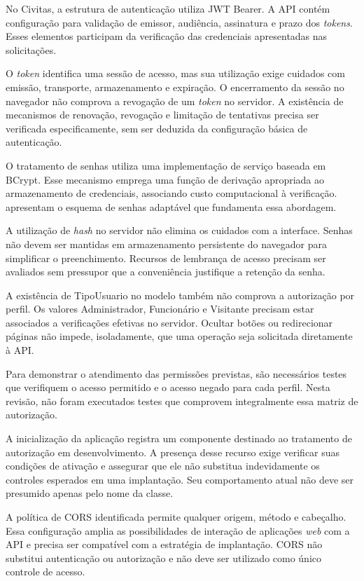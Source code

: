 No Civitas, a estrutura de autenticação utiliza JWT Bearer. A API contém configuração para validação de emissor, audiência, assinatura e prazo dos \textit{tokens}. Esses elementos participam da verificação das credenciais apresentadas nas solicitações.

O \textit{token} identifica uma sessão de acesso, mas sua utilização exige cuidados com emissão, transporte, armazenamento e expiração. O encerramento da sessão no navegador não comprova a revogação de um \textit{token} no servidor. A existência de mecanismos de renovação, revogação e limitação de tentativas precisa ser verificada especificamente, sem ser deduzida da configuração básica de autenticação.

O tratamento de senhas utiliza uma implementação de serviço baseada em BCrypt. Esse mecanismo emprega uma função de derivação apropriada ao armazenamento de credenciais, associando custo computacional à verificação. \textcite{ProvosMazieres1999} apresentam o esquema de senhas adaptável que fundamenta essa abordagem.

A utilização de \textit{hash} no servidor não elimina os cuidados com a interface. Senhas não devem ser mantidas em armazenamento persistente do navegador para simplificar o preenchimento. Recursos de lembrança de acesso precisam ser avaliados sem pressupor que a conveniência justifique a retenção da senha.

A existência de TipoUsuario no modelo também não comprova a autorização por perfil. Os valores Administrador, Funcionário e Visitante precisam estar associados a verificações efetivas no servidor. Ocultar botões ou redirecionar páginas não impede, isoladamente, que uma operação seja solicitada diretamente à API.

Para demonstrar o atendimento das permissões previstas, são necessários testes que verifiquem o acesso permitido e o acesso negado para cada perfil. Nesta revisão, não foram executados testes que comprovem integralmente essa matriz de autorização.

A inicialização da aplicação registra um componente destinado ao tratamento de autorização em desenvolvimento. A presença desse recurso exige verificar suas condições de ativação e assegurar que ele não substitua indevidamente os controles esperados em uma implantação. Seu comportamento atual não deve ser presumido apenas pelo nome da classe.

A política de CORS identificada permite qualquer origem, método e cabeçalho. Essa configuração amplia as possibilidades de interação de aplicações \textit{web} com a API e precisa ser compatível com a estratégia de implantação. CORS não substitui autenticação ou autorização e não deve ser utilizado como único controle de acesso.

